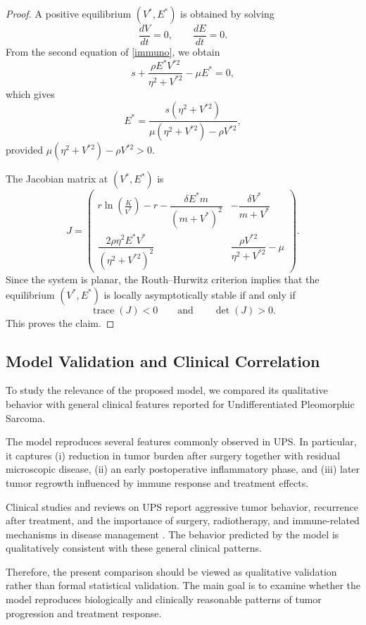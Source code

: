 \documentclass[11pt, reqno]{amsart}
\numberwithin{equation}{section}
\theoremstyle{definition}
\begin{document}
\begin{proof}
A positive equilibrium $(V^*,E^*)$ is obtained by solving
\[
\frac{dV}{dt}=0,\qquad \frac{dE}{dt}=0.
\]
From the second equation of \eqref{immuno}, we obtain
\[
s+\frac{\rho E^*V^{*2}}{\eta^2+V^{*2}}-\mu E^*=0,
\]
which gives
\[
E^*=\frac{s(\eta^2+V^{*2})}{\mu(\eta^2+V^{*2})-\rho V^{*2}},
\]
provided $\mu(\eta^2+V^{*2})-\rho V^{*2}>0$.

The Jacobian matrix at $(V^*,E^*)$ is
\[
J=
\begin{pmatrix}
r\ln\!\left(\frac{K}{V^*}\right)-r-\dfrac{\delta E^*m}{(m+V^*)^2}
&
-\dfrac{\delta V^*}{m+V^*}
\\[3mm]
\dfrac{2\rho\eta^2E^*V^*}{(\eta^2+V^{*2})^2}
&
\dfrac{\rho V^{*2}}{\eta^2+V^{*2}}-\mu
\end{pmatrix}.
\]
Since the system is planar, the Routh--Hurwitz criterion implies that
the equilibrium $(V^*,E^*)$ is locally asymptotically stable if and
only if
\[
\operatorname{trace}(J)<0
\qquad\text{and}\qquad
\det(J)>0.
\]
This proves the claim.
\end{proof}




\subsection{Model Validation and Clinical Correlation}

To study the relevance of the proposed model, we compared its qualitative behavior with general clinical features reported for Undifferentiated Pleomorphic Sarcoma.

The model reproduces several features commonly observed in UPS. In particular, it captures (i) reduction in tumor burden after surgery together with residual microscopic disease, (ii) an early postoperative inflammatory phase, and (iii) later tumor regrowth influenced by immune response and treatment effects.

Clinical studies and reviews on UPS report aggressive tumor behavior, recurrence after treatment, and the importance of surgery, radiotherapy, and immune-related mechanisms in disease management \cite{Crago2022, Sun2023}. The behavior predicted by the model is qualitatively consistent with these general clinical patterns.

Therefore, the present comparison should be viewed as qualitative validation rather than formal statistical validation. The main goal is to examine whether the model reproduces biologically and clinically reasonable patterns of tumor progression and treatment response.
\end{document}
